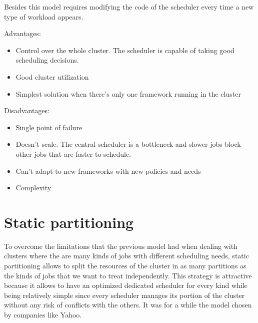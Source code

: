 \documentclass{report}                     %
\begin{document}
Besides this model requires modifying the code of the scheduler every
time a new type of workload appears. 

Advantages:

\begin{itemize}
  \item Control over the whole cluster. The scheduler is capable of taking good scheduling decisions.
  \item Good cluster utilization
  \item Simplest solution when there's only one framework running in the cluster
\end{itemize}

Disadvantages:

\begin{itemize}
  \item Single point of failure
  \item Doesn't scale. The central scheduler is a bottleneck and
    slower jobs block other jobs that are faster to schedule.
  \item Can't adapt to new frameworks with new policies and needs
  \item Complexity
\end{itemize}

\section{Static partitioning}

To overcome the limitations that the previous model had when dealing
with clusters where the are many kinds of jobs with different scheduling
needs, static partitioning allows to split the resources of the cluster
in as many partitions as the kinds of jobs that we want to
treat independently. This strategy is attractive because it allows to
have an optimized dedicated scheduler for every kind while being
relatively simple since every scheduler manages its portion of the
cluster without any risk of conflicts with the others. It was
for a while the model chosen by companies like Yahoo.
\end{document}
